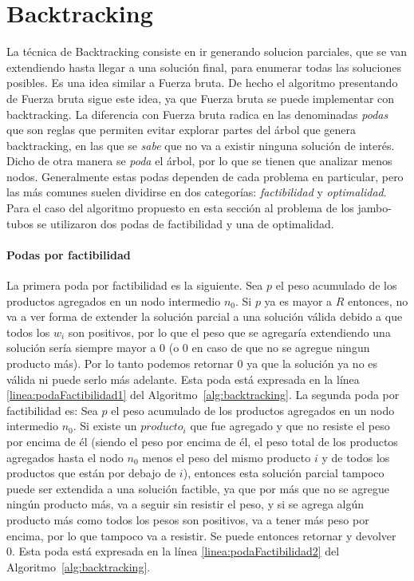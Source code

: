 \documentclass[10pt,a4paper]{article}
\begin{document}
\section{Backtracking} \label{sec:backtracking}
La técnica de Backtracking consiste en ir generando solucion parciales, que se van extendiendo hasta llegar a una solución final, para enumerar todas las soluciones posibles. Es una idea similar a Fuerza bruta. De hecho el algoritmo presentando de Fuerza bruta sigue este idea, ya que Fuerza bruta se puede implementar con backtracking. La diferencia con Fuerza bruta radica en las denominadas \emph{podas} que son reglas que permiten evitar explorar partes del árbol que genera backtracking, en las que se \emph{sabe} que no va a existir ninguna solución de interés. Dicho de otra manera se \emph{poda} el árbol, por lo que se tienen que analizar menos nodos.  Generalmente estas podas dependen de cada problema en particular, pero las más comunes suelen dividirse en dos categorías: \emph{factibilidad} y \emph{optimalidad}. Para el caso del algoritmo propuesto en esta sección al problema de los jambo-tubos se utilizaron dos podas de factibilidad y una de optimalidad. 

\paragraph{Podas por factibilidad}
La primera poda por factibilidad es la siguiente. Sea $p$ el peso acumulado de los productos agregados en un nodo intermedio $n_0$. Si $p$ ya es mayor a $R$ entonces, no va a ver forma de extender la solución parcial a una solución válida debido a que todos los $w_i$ son positivos, por lo que el peso que se agregaría extendiendo una solución sería siempre mayor a 0 (o 0 en caso de que no se agregue ningun producto más). Por lo tanto podemos retornar 0 ya que la solución ya no es válida ni puede serlo más adelante. Esta poda está expresada en la línea \ref{linea:podaFactibilidad1} del Algoritmo~\ref{alg:backtracking}.
La segunda poda por factibilidad es: Sea $p$ el peso acumulado de los productos agregados en un nodo intermedio $n_0$. Si existe un $producto_i$ que fue agregado y que no resiste el peso por encima de él (siendo el peso por encima de él, el peso total de los productos agregados hasta el nodo $n_0$ menos el peso del mismo producto $i$ y de todos los productos que están por debajo de $i$), entonces esta solución parcial tampoco puede ser extendida a una solución factible, ya que por más que no se agregue ningún producto más, va a seguir sin resistir el peso, y si se agrega algún producto más como todos los pesos son positivos, va a tener más peso por encima, por lo que tampoco va a resistir. Se puede entonces retornar y devolver 0. Esta poda está expresada en la línea \ref{linea:podaFactibilidad2} del Algoritmo~\ref{alg:backtracking}.
\end{document}
